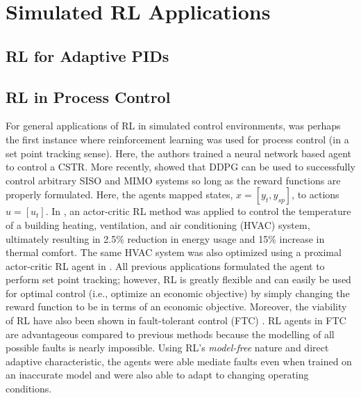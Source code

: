 \section{Simulated RL Applications}
\subsection{RL for Adaptive PIDs}
















\subsection{RL in Process Control}
For general applications of RL in simulated control environments, \cite{ref-pc} was perhaps the first instance where reinforcement learning was used for process control (in a set point tracking sense). Here, the authors trained a neural network based agent to control a CSTR. More recently, \cite{pc1} showed that DDPG can be used to successfully control arbitrary SISO and MIMO systems so long as the reward functions are properly formulated.  Here, the agents mapped states, $x = [y_t, y_{sp}]$, to actions $u = [u_t]$.  In \cite{pc2}, an actor-critic RL method was applied to control the temperature of a building heating, ventilation, and air conditioning (HVAC) system, ultimately resulting in 2.5\% reduction in energy usage and 15\% increase in thermal comfort. The same HVAC system was also optimized using a proximal actor-critic RL agent in \cite{pc3}. All previous applications formulated the agent to perform set point tracking; however, RL is greatly flexible and can easily be used for optimal control (i.e., optimize an economic objective) by simply changing the reward function to be in terms of an economic objective. Moreover, the viability of RL have also been shown in fault-tolerant control (FTC) \cite{ftc}. RL agents in FTC are advantageous compared to previous methods because the modelling of all possible faults is nearly impossible.  Using RL's \textit{model-free} nature and direct adaptive characteristic, the agents were able mediate faults even when trained on an inaccurate model and were also able to adapt to changing operating conditions.













